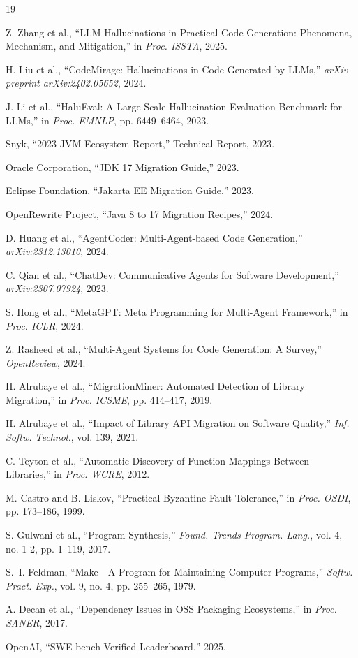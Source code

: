 \documentclass[10pt,conference]{IEEEtran}
\begin{document}

\begin{thebibliography}{19}

Z. Zhang et al., ``LLM Hallucinations in Practical Code Generation: Phenomena, Mechanism, and Mitigation,'' in \textit{Proc. ISSTA}, 2025.

H. Liu et al., ``CodeMirage: Hallucinations in Code Generated by LLMs,'' \textit{arXiv preprint arXiv:2402.05652}, 2024.

J. Li et al., ``HaluEval: A Large-Scale Hallucination Evaluation Benchmark for LLMs,'' in \textit{Proc. EMNLP}, pp. 6449--6464, 2023.

Snyk, ``2023 JVM Ecosystem Report,'' Technical Report, 2023.

Oracle Corporation, ``JDK 17 Migration Guide,'' 2023.

Eclipse Foundation, ``Jakarta EE Migration Guide,'' 2023.

OpenRewrite Project, ``Java 8 to 17 Migration Recipes,'' 2024.

D. Huang et al., ``AgentCoder: Multi-Agent-based Code Generation,'' \textit{arXiv:2312.13010}, 2024.

C. Qian et al., ``ChatDev: Communicative Agents for Software Development,'' \textit{arXiv:2307.07924}, 2023.

S. Hong et al., ``MetaGPT: Meta Programming for Multi-Agent Framework,'' in \textit{Proc. ICLR}, 2024.

Z. Rasheed et al., ``Multi-Agent Systems for Code Generation: A Survey,'' \textit{OpenReview}, 2024.

H. Alrubaye et al., ``MigrationMiner: Automated Detection of Library Migration,'' in \textit{Proc. ICSME}, pp. 414--417, 2019.

H. Alrubaye et al., ``Impact of Library API Migration on Software Quality,'' \textit{Inf. Softw. Technol.}, vol. 139, 2021.

C. Teyton et al., ``Automatic Discovery of Function Mappings Between Libraries,'' in \textit{Proc. WCRE}, 2012.

M. Castro and B. Liskov, ``Practical Byzantine Fault Tolerance,'' in \textit{Proc. OSDI}, pp. 173--186, 1999.

S. Gulwani et al., ``Program Synthesis,'' \textit{Found. Trends Program. Lang.}, vol. 4, no. 1-2, pp. 1--119, 2017.

S.~I. Feldman, ``Make---A Program for Maintaining Computer Programs,'' \textit{Softw. Pract. Exp.}, vol. 9, no. 4, pp. 255--265, 1979.

A. Decan et al., ``Dependency Issues in OSS Packaging Ecosystems,'' in \textit{Proc. SANER}, 2017.

OpenAI, ``SWE-bench Verified Leaderboard,'' 2025.

\end{thebibliography}


\end{document}
